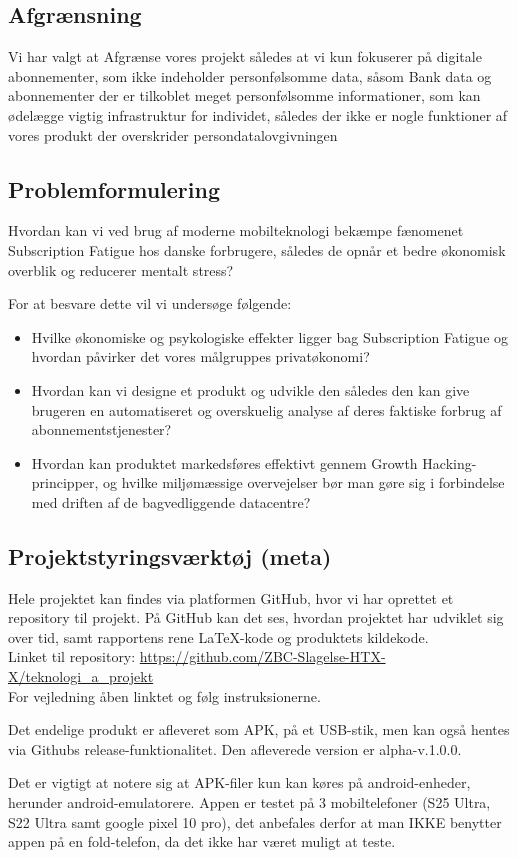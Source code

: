 \subsection{Afgrænsning}
Vi har valgt at Afgrænse vores projekt således at vi kun fokuserer på digitale abonnementer, som ikke indeholder personfølsomme data, såsom Bank data og abonnementer der er tilkoblet meget personfølsomme informationer, som kan ødelægge vigtig infrastruktur for individet, således der ikke er nogle funktioner af vores produkt der overskrider persondatalovgivningen

\subsection{Problemformulering}
Hvordan kan vi ved brug af moderne mobilteknologi bekæmpe fænomenet Subscription Fatigue hos danske forbrugere, således de opnår et bedre økonomisk overblik og reducerer mentalt stress?

For at besvare dette vil vi undersøge følgende:
\begin{itemize}
    \item Hvilke økonomiske og psykologiske effekter ligger bag Subscription Fatigue og hvordan påvirker det vores målgruppes privatøkonomi?
    \item Hvordan kan vi designe et produkt og udvikle den således den kan give brugeren en automatiseret og overskuelig analyse af deres faktiske forbrug af abonnementstjenester?
    \item Hvordan kan produktet markedsføres effektivt gennem Growth Hacking-principper, og hvilke miljømæssige overvejelser bør man gøre sig i forbindelse med driften af de bagvedliggende datacentre?
\end{itemize}




\subsection{Projektstyringsværktøj (meta)}
Hele projektet kan findes via platformen GitHub, hvor vi har oprettet et repository til projekt. På GitHub kan det ses, hvordan projektet har udviklet sig over tid, samt rapportens rene \LaTeX-kode og produktets kildekode.\\ 

Linket til repository: \url{https://github.com/ZBC-Slagelse-HTX-X/teknologi_a_projekt}\\
For vejledning åben linktet og følg instruksionerne.

Det endelige produkt er afleveret som APK, på et USB-stik, men kan også hentes via Githubs release-funktionalitet. Den afleverede version er alpha-v.1.0.0. 

Det er vigtigt at notere sig at APK-filer kun kan køres på android-enheder, herunder android-emulatorere. Appen er testet på 3 mobiltelefoner (S25 Ultra, S22 Ultra samt google pixel 10 pro), det anbefales derfor at man IKKE benytter appen på en fold-telefon, da det ikke har været muligt at teste.